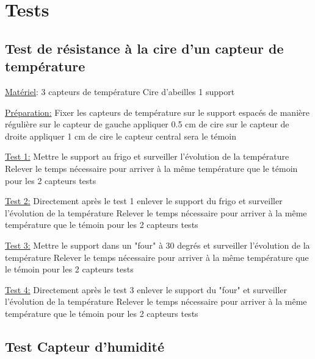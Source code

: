\chapter{Tests}

\section{Test de résistance à la cire d'un capteur de température}

\noindent \underline{Matériel}:  
3 capteurs de température  
Cire d'abeilles  
1 support\newline  

\noindent \underline{Préparation:} \newline 
Fixer les capteurs de température sur le support espacés de manière régulière sur le capteur de gauche appliquer 0.5 cm de cire sur le capteur de droite appliquer 1 cm de cire le capteur central sera le témoin \newline

\noindent \underline{Test 1:} \newline 
Mettre le support au frigo et surveiller l'évolution de la température\newline   
Relever le temps nécessaire pour arriver à la même température que le témoin pour les 2 capteurs tests  

\noindent \underline{Test 2:}  \newline 
Directement après le test 1 enlever le support du frigo et surveiller l'évolution de la température\newline   
Relever le temps nécessaire pour arriver à la même température que le témoin pour les 2 capteurs tests

\noindent \underline{Test 3:}  \newline 
Mettre le support dans un "four" à 30 degrés et surveiller l'évolution de la température\newline   
Relever le temps nécessaire pour arriver à la même température que le témoin pour les 2 capteurs tests  
  
\noindent \underline{Test 4:}  \newline 
Directement après le test 3 enlever le support du "four" et surveiller l'évolution de la température\newline   
Relever le temps nécessaire pour arriver à la même température que le témoin pour les 2 capteurs tests


\newpage

\section{Test Capteur d'humidité} 

